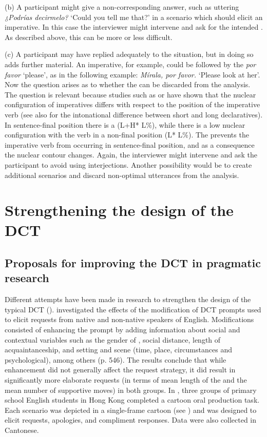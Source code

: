 \documentclass[output=paper]{LSP/langsci}
\begin{document}
(b) A participant might give a non-corresponding answer, such as uttering \textit{¿Podrías decirmelo?} ‘Could you tell me that?’ in a scenario which should elicit an imperative. In this case the interviewer might intervene and ask for the intended . As described above, this can be more or less difficult.

(c) A participant may have replied adequately to the situation, but in doing so adds further material. An imperative, for example, could be followed by the  \textit{por favor} ‘please’, as in the following  example: \textit{Mírala, por favor.} ‘Please look at her’. Now the question arises as to whether the  can be discarded from the analysis. The question is relevant because studies such as \citet{Brehm2014} or \citet{Lausecker2014} have shown that the nuclear configuration of imperatives differs with respect to the position of the imperative verb (see also \citealt{Prieto2002} for the intonational difference between short and long declaratives). In sentence-final position there is a  (L+H* L\%), while there is a low nuclear configuration with the verb in a non-final position (L* L\%). The  prevents the imperative verb from occurring in sentence-final position, and as a consequence the nuclear contour changes. Again, the interviewer might intervene and ask the participant to avoid using interjections. Another possibility would be to create additional scenarios and discard non-optimal utterances from the analysis.


\section{Strengthening the design of the DCT}
\label{sec:van:3}
\subsection{Proposals for improving the DCT in pragmatic research}
\label{sec:van:3.1}

Different attempts have been made in  research to strengthen the design of the typical DCT (\citealt{Billmyer2000,Rose2000,Cohen2003,Schauer2004,McLean2005}). \citet{Billmyer2000} investigated the effects of the modification of DCT prompts used to elicit requests from native and non-native speakers of English. Modifications consisted of enhancing the prompt by adding information about social and contextual variables such as the gender of , social distance, length of acquaintanceship, and setting and scene (time, place, circumstances and psychological), among others (p. 546). The results conclude that while enhancement did not generally affect the request strategy, it did result in significantly more elaborate requests (in terms of mean length of the  and the mean number of supportive moves) in both groups. In \citet{Rose2000}, three groups of primary school English students in Hong Kong completed a cartoon oral production task. Each scenario was depicted in a single-frame cartoon (see ) and was designed to elicit requests, apologies, and compliment responses. Data were also collected in Cantonese. 
\end{document}
